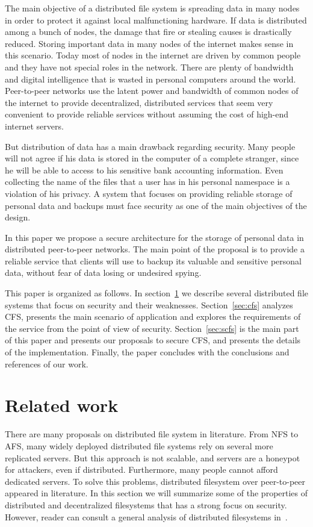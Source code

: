\documentclass{llncs}
\begin{document}
The main objective of a distributed file system is spreading data in many nodes in order to protect it against local malfunctioning hardware. If data is distributed among a bunch of nodes, the damage that fire or stealing causes is drastically reduced. Storing important data in many nodes of the internet makes sense in this scenario. Today most of nodes in the internet are driven by common people and they have not special roles in the network. There are plenty of bandwidth and digital intelligence that is wasted in personal computers around the world. Peer-to-peer networks use the latent power and bandwidth of common nodes of the internet to provide decentralized, distributed services that seem very convenient to provide reliable services without assuming the cost of high-end internet servers.

But distribution of data has a main drawback regarding security. Many people will not agree if his data is stored in the computer of a complete stranger, since he will be able to access to his sensitive bank accounting information. Even collecting the name of the files that a user has in his personal namespace is a violation of his privacy. A system that focuses on providing reliable storage of personal data and backups must face security as one of the main objectives of the design.

In this paper we propose a secure architecture for the storage of personal data in distributed peer-to-peer networks. The main point of the proposal is to provide a reliable service that clients will use to backup its valuable and sensitive personal data, without fear of data losing or undesired spying.

This paper is organized as follows. In section~\ref{sec:related} we describe several distributed file systems that focus on security and their weaknesses. Section~\ref{sec:cfs} analyzes CFS, presents the main scenario of application and explores the requirements of the service from the point of view of security. Section~\ref{sec:scfs} is the main part of this paper and presents our proposals to secure CFS, and presents the details of the implementation. Finally, the paper concludes with the conclusions and references of our work.

\section{Related work}
\label{sec:related}

There are many proposals on distributed file system in literature. From NFS to AFS, many widely deployed distributed file systems rely on several more replicated servers. But this approach is not scalable, and servers are a honeypot for attackers, even if distributed. Furthermore, many people cannot afford dedicated servers. To solve this problems, distributed filesystem over peer-to-peer appeared in literature. In this section we will summarize some of the properties of distributed and decentralized filesystems that has a strong focus on security. However, reader can consult a general analysis of distributed filesystems in~\cite{DFSSURVEY}.
\end{document}
